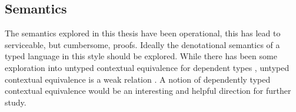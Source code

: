 \subsection{Semantics}

The semantics explored in this thesis have been operational, this
has lead to serviceable, but cumbersome, proofs. Ideally the denotational
semantics of a typed language in this style should be explored. While
there has been some exploration into untyped contextual equivalence
for dependent types \cite{sjoberg2015dependently,jia2010dependent},
untyped contextual equivalence is a weak relation . A notion of dependently typed contextual equivalence would be an
interesting and helpful direction for further study.
